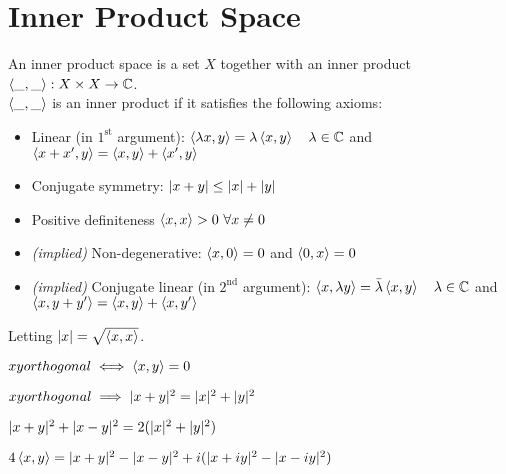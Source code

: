 \section{Inner Product Space}
An inner product space is a set $X$ together with an inner product $\left\langle \_,\_ \right\rangle: X \times X \to \mathbb{C}$.\\
$\left\langle \_,\_ \right\rangle$ is an inner product if it satisfies the following axioms:
\begin{itemize}
	\item Linear (in $1^{\text{st}}$ argument): $\left\langle \lambda x,y \right\rangle = \lambda \left\langle x,y \right\rangle \quad \lambda \in \mathbb{C}$ and $\left\langle x+x',y \right\rangle = \left\langle x,y \right\rangle +\left\langle x',y \right\rangle$
	\item Conjugate symmetry: $| x+y | \leq | x | + | y |$
	\item Positive definiteness $\left\langle x,x \right\rangle>0 \ \forall x \neq 0$
	\item \textit{(implied)} Non-degenerative: $\left\langle x,0 \right\rangle=0$ and $\left\langle 0,x \right\rangle=0$
	\item \textit{(implied)} Conjugate linear (in $2^{\text{nd}}$ argument): $\left\langle x,\lambda y \right\rangle = \bar{\lambda} \left\langle x,y \right\rangle \quad \lambda \in \mathbb{C}$ and $\left\langle x,y+y' \right\rangle = \left\langle x,y \right\rangle +\left\langle x,y' \right\rangle$
\end{itemize}
\begin{property}
	Letting $| x | = \sqrt{\left\langle x,x \right\rangle}$.
\end{property}
\begin{definition}
	$x y orthogonal \iff \left\langle x,y \right\rangle=0$
\end{definition}
\begin{property}
	$x y orthogonal \implies | x+y |^2 = | x |^2 + | y |^2$
\end{property}
\begin{property}
	$| x+y |^2 +| x-y |^2 = 2 (| x |^2 + | y |^2)$
\end{property}
\begin{property}
	$4 \left\langle x,y \right\rangle = | x+y |^2 - | x-y |^2 + i(| x+iy |^2 - | x-iy |^2)$
\end{property}





